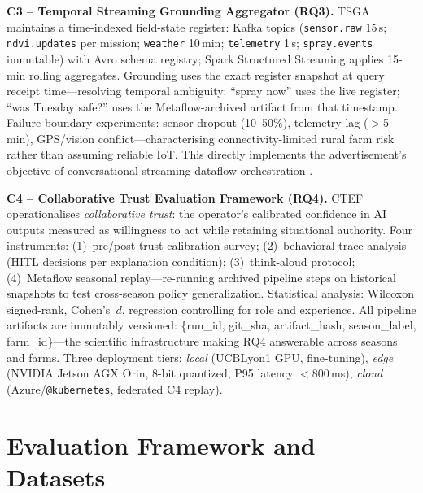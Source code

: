 \documentclass[11pt,a4paper]{article}
\begin{document}
\textbf{C3 -- Temporal Streaming Grounding Aggregator (RQ3).}
TSGA maintains a time-indexed field-state register: Kafka topics (\texttt{sensor.raw} 15\,s; \texttt{ndvi.updates} per mission; \texttt{weather} 10\,min; \texttt{telemetry} 1\,s; \texttt{spray.events} immutable) with Avro schema registry; Spark Structured Streaming applies 15-min rolling aggregates.
Grounding uses the exact register snapshot at query receipt time---resolving temporal ambiguity: ``spray now'' uses the live register; ``was Tuesday safe?'' uses the Metaflow-archived artifact from that timestamp.
Failure boundary experiments: sensor dropout (10--50\%), telemetry lag ($>$5\,min), GPS/vision conflict---characterising connectivity-limited rural farm risk rather than assuming reliable IoT.
This directly implements the advertisement's objective of conversa\-tional streaming dataflow orchestration \citep{phd_adv_2026}.

\textbf{C4 -- Collaborative Trust Evaluation Framework (RQ4).}
CTEF operationalises \textit{collaborative trust}: the operator's calibrated confidence in AI outputs measured as willingness to act while retaining situational authority.
Four instruments: (1)~pre/post trust calibration survey; (2)~behavioral trace analysis (HITL decisions per explanation condition); (3)~think-aloud protocol; (4)~Metaflow seasonal replay---re-running archived pipeline steps on historical snapshots to test cross-season policy generalization.
Statistical analysis: Wilcoxon signed-rank, Cohen's~$d$, regression controlling for role and experience.
All pipeline artifacts are immutably versioned: \{run\_id, git\_sha, artifact\_hash, season\_label, farm\_id\}---the scientific infrastructure making RQ4 answerable across seasons and farms.
Three deployment tiers: \textit{local} (UCBLyon1 GPU, fine-tuning), \textit{edge} (NVIDIA Jetson AGX Orin, 8-bit quantized, P95 latency $<$800\,ms), \textit{cloud} (Azure/\texttt{@kubernetes}, federated C4 replay).

\section{Evaluation Framework and Datasets}
\end{document}

